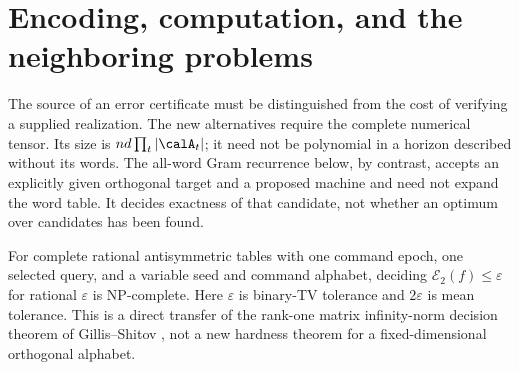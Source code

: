 \section{Encoding, computation, and the neighboring problems}\label{sec:encoding49}
The source of an error certificate must be distinguished from the cost
of verifying a supplied realization. The new alternatives require the
complete numerical tensor. Its size is $n d\prod_t|\calA_t|$; it need
not be polynomial in a horizon described without its words. The
all-word Gram recurrence below, by contrast, accepts an explicitly
given orthogonal target and a proposed machine and need not expand
the word table. It decides exactness of that candidate, not whether
an optimum over candidates has been found.

\begin{proposition}
\label{prop:hard49}
For complete rational antisymmetric tables with one command epoch,
one selected query, and a variable seed and command alphabet,
deciding $\mathcal E_2(f)\le\varepsilon$ for rational $\varepsilon$
is NP-complete. Here $\varepsilon$ is binary-TV tolerance and $2\varepsilon$ is mean tolerance. This is a direct transfer of the rank-one matrix
infinity-norm decision theorem of Gillis--Shitov \cite[Theorem 3]{GS19},
not a new hardness theorem for a fixed-dimensional orthogonal alphabet.
\end{proposition}
